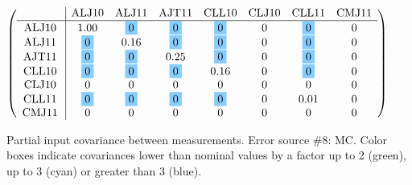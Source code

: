 \begin{table}[H]
\scriptsize
\begin{center}
\renewcommand{\arraystretch}{1.1}
\begin{math}\left(\begin{array}{c|ccccccc}
 & \mathrm{ALJ10} & 
\mathrm{ALJ11} & 
\mathrm{AJT11} & 
\mathrm{CLL10} & 
\mathrm{CLJ10} & 
\mathrm{CLL11} & 
\mathrm{CMJ11} \\
\hline
\mathrm{ALJ10} \hspace*{2pt} &       1.00 &  \colorbox{SkyBlue1}{$ 0$} &  \colorbox{SkyBlue1}{$ 0$} &  \colorbox{SkyBlue1}{$ 0$} &  0 &  \colorbox{SkyBlue1}{$ 0$} &  0 \\
\mathrm{ALJ11} \hspace*{2pt} &  \colorbox{SkyBlue1}{$ 0$} &       0.16 &  \colorbox{SkyBlue1}{$ 0$} &  \colorbox{SkyBlue1}{$ 0$} &  0 &  \colorbox{SkyBlue1}{$ 0$} &  0 \\
\mathrm{AJT11} \hspace*{2pt} &  \colorbox{SkyBlue1}{$ 0$} &  \colorbox{SkyBlue1}{$ 0$} &       0.25 &  \colorbox{SkyBlue1}{$ 0$} &  0 &  \colorbox{SkyBlue1}{$ 0$} &  0 \\
\mathrm{CLL10} \hspace*{2pt} &  \colorbox{SkyBlue1}{$ 0$} &  \colorbox{SkyBlue1}{$ 0$} &  \colorbox{SkyBlue1}{$ 0$} &       0.16 &  0 &  \colorbox{SkyBlue1}{$ 0$} &  0 \\
\mathrm{CLJ10} \hspace*{2pt} &  0 &  0 &  0 &  0 &  0 &  0 &  0 \\
\mathrm{CLL11} \hspace*{2pt} &  \colorbox{SkyBlue1}{$ 0$} &  \colorbox{SkyBlue1}{$ 0$} &  \colorbox{SkyBlue1}{$ 0$} &  \colorbox{SkyBlue1}{$ 0$} &  0 &       0.01 &  0 \\
\mathrm{CMJ11} \hspace*{2pt} &  0 &  0 &  0 &  0 &  0 &  0 &  0 \\
\end{array}\right)\end{math}
\caption{Partial input covariance between measurements. Error source \#8: MC. Color boxes indicate covariances lower than nominal values by a factor up to 2 (green), up to 3 (cyan) or greater than 3 (blue).}
\renewcommand{\arraystretch}{1}
\end{center}
\end{table}
